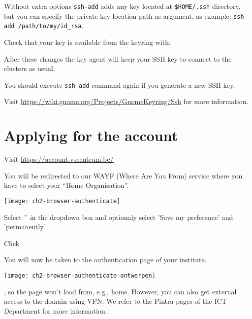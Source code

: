 \begin{prompt}
\end{prompt}

\begin{tip}
  Without extra options \lstinline|ssh-add| adds any key located at \lstinline|$HOME/.ssh|
  directory, but you can specify the private key location path as argument,
  as example: \lstinline|ssh-add /path/to/my/id_rsa|.
\end{tip}

Check that your key is available from the keyring with:
\begin{prompt}
\end{prompt}

  After these changes the key agent will keep your SSH key to connect
  to the clusters as usual.
\begin{tip}
  You should execute \lstinline|ssh-add| command again if you generate a new SSH key.
\end{tip}

\iflinux
  Visit \url{https://wiki.gnome.org/Projects/GnomeKeyring/Ssh} for
  more information.
\fi
\fi %

\section{Applying for the account}
\label{sec:applying-for-the-account}

Visit \url{https://account.vscentrum.be/}

You will be redirected to our WAYF (Where Are You From) service where you have to select your ``Home Organisation''.

\begin{center}
\texttt{[image: ch2-browser-authenticate]}
\end{center}

Select '\wayf' in the dropdown box and optionaly select 'Save my preference' and 'permanently.'

Click 

You will now be taken to the authentication page of your institute.

\ifantwerpen
\begin{center}
\texttt{[image: ch2-browser-authenticate-antwerpen]}
\end{center}

, so the page won't load from, e.g., home. However, you can also get
external access to the \university domain using VPN. We refer to the Pintra
pages of the ICT Department
for more information.

